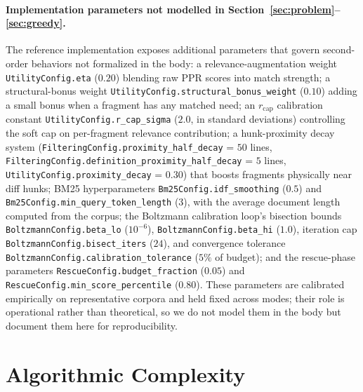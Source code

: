 \documentclass[11pt, a4paper]{article}
\begin{document}
\paragraph{Implementation parameters not modelled in Section~\ref{sec:problem}--\ref{sec:greedy}.} The reference implementation exposes additional parameters that govern second-order behaviors not formalized in the body: a relevance-augmentation weight \texttt{UtilityConfig.eta} ($0.20$) blending raw PPR scores into match strength; a structural-bonus weight \texttt{UtilityConfig.structural\_bonus\_weight} ($0.10$) adding a small bonus when a fragment has any matched need; an $r_{\mathrm{cap}}$ calibration constant \texttt{UtilityConfig.r\_cap\_sigma} ($2.0$, in standard deviations) controlling the soft cap on per-fragment relevance contribution; a hunk-proximity decay system (\texttt{FilteringConfig.proximity\_half\_decay} = $50$ lines, \texttt{FilteringConfig.definition\_proximity\_half\_decay} = $5$ lines, \texttt{UtilityConfig.proximity\_decay} = $0.30$) that boosts fragments physically near diff hunks; BM25 hyperparameters \texttt{Bm25Config.idf\_smoothing} ($0.5$) and \texttt{Bm25Config.min\_query\_token\_length} ($3$), with the average document length computed from the corpus; the Boltzmann calibration loop's bisection bounds \texttt{BoltzmannConfig.beta\_lo} ($10^{-6}$), \texttt{BoltzmannConfig.beta\_hi} ($1.0$), iteration cap \texttt{BoltzmannConfig.bisect\_iters} ($24$), and convergence tolerance \texttt{BoltzmannConfig.calibration\_tolerance} ($5\%$ of budget); and the rescue-phase parameters \texttt{RescueConfig.budget\_fraction} ($0.05$) and \texttt{RescueConfig.min\_score\_percentile} ($0.80$). These parameters are calibrated empirically on representative corpora and held fixed across modes; their role is operational rather than theoretical, so we do not model them in the body but document them here for reproducibility.

\newpage
\section{Algorithmic Complexity}
\end{document}
